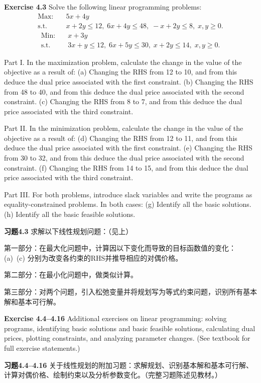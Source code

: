 \begin{original}
\textbf{Exercise 4.3} Solve the following linear programming problems:
\[
\begin{aligned}
\text{Max:} \quad & 5x + 4y \\
\text{s.t.} \quad & x + 2y \le 12,\; 6x + 4y \le 48,\; -x + 2y \le 8,\; x, y \ge 0.
\end{aligned}
\]
\[
\begin{aligned}
\text{Min:} \quad & x + 3y \\
\text{s.t.} \quad & 3x + y \le 12,\; 6x + 5y \le 30,\; x + 2y \le 14,\; x, y \ge 0.
\end{aligned}
\]

Part I. In the maximization problem, calculate the change in the value of the objective as a result of:
(a) Changing the RHS from 12 to 10, and from this deduce the dual price associated with the first constraint.
(b) Changing the RHS from 48 to 40, and from this deduce the dual price associated with the second constraint.
(c) Changing the RHS from 8 to 7, and from this deduce the dual price associated with the third constraint.

Part II. In the minimization problem, calculate the change in the value of the objective as a result of:
(d) Changing the RHS from 12 to 11, and from this deduce the dual price associated with the first constraint.
(e) Changing the RHS from 30 to 32, and from this deduce the dual price associated with the second constraint.
(f) Changing the RHS from 14 to 15, and from this deduce the dual price associated with the third constraint.

Part III. For both problems, introduce slack variables and write the programs as equality-constrained problems. In both cases:
(g) Identify all the basic solutions.
(h) Identify all the basic feasible solutions.
\end{original}
\begin{translation}
\textbf{习题4.3} 求解以下线性规划问题：（见上）

第一部分：在最大化问题中，计算因以下变化而导致的目标函数值的变化：
(a)~(c) 分别为改变各约束的RHS并推导相应的对偶价格。

第二部分：在最小化问题中，做类似计算。

第三部分：对两个问题，引入松弛变量并将规划写为等式约束问题，识别所有基本解和基本可行解。
\end{translation}

\begin{original}
\textbf{Exercise 4.4--4.16} Additional exercises on linear programming: solving programs, identifying basic solutions and basic feasible solutions, calculating dual prices, plotting constraints, and analyzing parameter changes. (See textbook for full exercise statements.)
\end{original}
\begin{translation}
\textbf{习题4.4--4.16} 关于线性规划的附加习题：求解规划、识别基本解和基本可行解、计算对偶价格、绘制约束以及分析参数变化。（完整习题陈述见教材。）
\end{translation}

